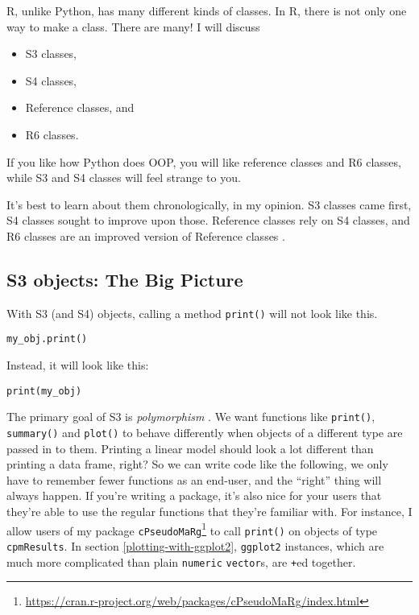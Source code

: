\documentclass[12pt,krantz2]{krantz}
\providecommand{\tightlist}{%
  \setlength{\itemsep}{0pt}\setlength{\parskip}{0pt}}
\renewcommand{\href}[2]{#2\footnote{\url{#1}}}
\begin{document}
R, unlike Python, has many different kinds of classes. In R, there is not only one way to make a class. There are many! I will discuss

\begin{itemize}
\tightlist
\item
  S3 classes,
\item
  S4 classes,
\item
  Reference classes, and
\item
  R6 classes.
\end{itemize}

If you like how Python does OOP, you will like reference classes and R6 classes, while S3 and S4 classes will feel strange to you.

It's best to learn about them chronologically, in my opinion. S3 classes came first, S4 classes sought to improve upon those. Reference classes rely on S4 classes, and R6 classes are an improved version of Reference classes \citep{wickham2014advanced}.

\hypertarget{s3-objects-the-big-picture}{%
\subsection{S3 objects: The Big Picture}\label{s3-objects-the-big-picture}}

With S3 (and S4) objects, calling a method \texttt{print()} will not look like this.

\begin{verbatim}
my_obj.print()
\end{verbatim}

Instead, it will look like this:

\begin{verbatim}
print(my_obj)
\end{verbatim}

The primary goal of S3 is \emph{polymorphism} \citep{grolemund2014hands}. We want functions like \texttt{print()}, \texttt{summary()} and \texttt{plot()} to behave differently when objects of a different type are passed in to them. Printing a linear model should look a lot different than printing a data frame, right? So we can write code like the following, we only have to remember fewer functions as an end-user, and the ``right'' thing will always happen. If you're writing a package, it's also nice for your users that they're able to use the regular functions that they're familiar with. For instance, I allow users of my package \href{https://cran.r-project.org/web/packages/cPseudoMaRg/index.html}{\texttt{cPseudoMaRg}} \citep{cpm} to call \texttt{print()} on objects of type \texttt{cpmResults}. In section \ref{plotting-with-ggplot2}, \texttt{ggplot2} instances, which are much more complicated than plain \texttt{numeric} \texttt{vector}s, are \texttt{+}ed together.
\end{document}
